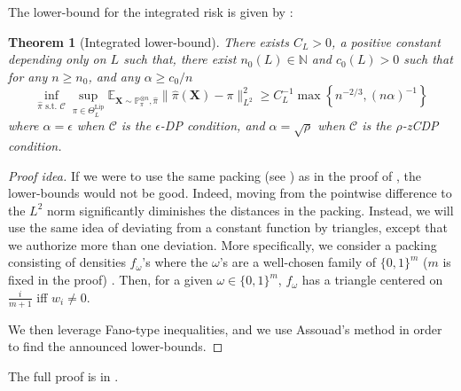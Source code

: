 \documentclass[10pt]{article} %
\newtheorem{theorem}{Theorem}
\newcommand{\N}[0]{\mathbb{N}}
\newcommand{\Prob}[0]{\mathbb{P}}
\newcommand{\E}[0]{\mathbb{E}}
\newcommand\vect[1]{\mathbf{#1}}
\newcommand\AG[1]{\textcolor{magenta}{#1}}
\begin{document}
The lower-bound for the integrated risk is given by :

\begin{theorem}[Integrated lower-bound]
\label{th:lidp}
There exists $C_L>0$, a positive constant depending only on $L$ such that, there exist $n_0(L) \in \N$ and $c_0(L) > 0$ such that for any $n \geq n_0$, and any $\alpha \geq c_0/n$
\begin{equation*}
    \inf_{\hat{\pi} \text{ s.t. } \mathcal{C}} \sup_{\pi \in \Theta^{\text{Lip}}_L}
    \E_{\vect{X} \sim \Prob_{\pi}^{\otimes n}, \hat{\pi}}\|\hat{\pi}(\vect{X})- \pi\|_{L^2}^2 \geq C_L^{-1} \max \left\{ n^{-2/3}, (n \alpha)^{-1} \right\}
\end{equation*}
where $\alpha=\epsilon$
when $\mathcal{C}$ is the $\epsilon$-DP condition, and 
$\alpha=\sqrt{\rho}$ when $\mathcal{C}$ is the $\rho$-zCDP condition.
\end{theorem}

\begin{proof}[Proof idea]
If we were to use the same packing (see ) as in the proof of , the lower-bounds would not be good. Indeed, moving from the pointwise difference to the $L^2$ norm significantly diminishes the distances in the packing. Instead, we will use %
the same idea of deviating from a constant function by triangles, except that we authorize more than one deviation. More specifically, we consider a packing consisting of densities $f_{\omega}$'s where the $\omega$'s are a well-chosen family of $\{ 0, 1 \}^m$ ($m$ is fixed in the proof) \citep{van2000asymptotic}. Then, for a given  $\omega \in \{ 0, 1 \}^m$, $f_{\omega}$ has a triangle centered on $\frac{i}{m+1}$ iff $w_i \neq 0$. %

We then leverage Fano-type inequalities, and we use Assouad's method in order to find the announced lower-bounds.
\end{proof}
The full proof is in .
\end{document}
